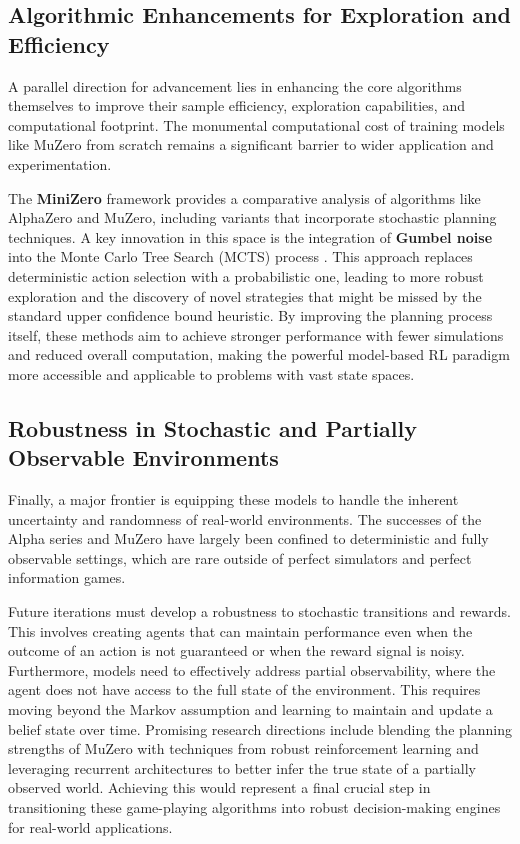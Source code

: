 \subsection{Algorithmic Enhancements for Exploration and Efficiency}
\label{subsec:algorithmic}

A parallel direction for advancement lies in enhancing the core algorithms themselves to improve their sample efficiency, exploration capabilities, and computational footprint. The monumental computational cost of training models like MuZero from scratch remains a significant barrier to wider application and experimentation.

The \textbf{MiniZero} framework \cite{wu2023minizero} provides a comparative analysis of algorithms like AlphaZero and MuZero, including variants that incorporate stochastic planning techniques. A key innovation in this space is the integration of \textbf{Gumbel noise} into the Monte Carlo Tree Search (MCTS) process \cite{danihelka2022policy}. This approach replaces deterministic action selection with a probabilistic one, leading to more robust exploration and the discovery of novel strategies that might be missed by the standard upper confidence bound heuristic. By improving the planning process itself, these methods aim to achieve stronger performance with fewer simulations and reduced overall computation, making the powerful model-based RL paradigm more accessible and applicable to problems with vast state spaces.

\subsection{Robustness in Stochastic and Partially Observable Environments}
\label{subsec:stochastic}

Finally, a major frontier is equipping these models to handle the inherent uncertainty and randomness of real-world environments. The successes of the Alpha series and MuZero have largely been confined to deterministic and fully observable settings, which are rare outside of perfect simulators and perfect information games.

Future iterations must develop a robustness to stochastic transitions and rewards. This involves creating agents that can maintain performance even when the outcome of an action is not guaranteed or when the reward signal is noisy. Furthermore, models need to effectively address partial observability, where the agent does not have access to the full state of the environment. This requires moving beyond the Markov assumption and learning to maintain and update a belief state over time. Promising research directions include blending the planning strengths of MuZero with techniques from robust reinforcement learning \cite{oikarinen2023robust} and leveraging recurrent architectures to better infer the true state of a partially observed world. Achieving this would represent a final crucial step in transitioning these game-playing algorithms into robust decision-making engines for real-world applications.
